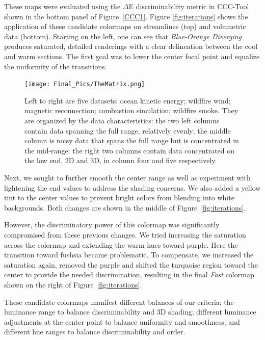 \documentclass{IEEEcsmag}
\newcommand*{\colormap}[1]{\textsl{#1}\xspace}
\newcommand*{\coolwarm}{\colormap{Cool to Warm}}
\newcommand*{\blueorange}{\colormap{Blue-Orange Diverging}}
\newcommand*{\fast}{\colormap{Fast}}
\begin{document}
These maps were evaluated using the $\Delta$E discriminability metric in CCC-Tool shown in the bottom panel of Figure~\ref{CCC1}. Figure \ref{fig:iterations} shows the application of these candidate colormaps on streamlines (top) and volumetric data (bottom).
Starting on the left, one can see that \blueorange produces saturated, detailed renderings with a clear delineation between the cool and warm sections.
The first goal was to lower the center focal point and equalize the uniformity of the transitions.

\begin{figure}[t]
\centering
\texttt{[image: Final\_Pics/TheMatrix.png]}
\caption{Left to right are five datasets: ocean kinetic energy; wildfire wind; magnetic reconnection; combustion simulation; wildfire smoke. They are organized by the data characteristics: the two left columns contain data spanning the full range, relatively evenly; the middle column is noisy data that spans the full range but is concentrated in the mid-range; the right two columns contain data concentrated on the low end, 2D and 3D, in column four and five respectively. }
\label{fig:Matrix}
\end{figure}


Next, we sought to further smooth the center range as well as experiment with lightening the end values to address the shading concerns.
We also added a yellow tint to the center values to prevent bright colors from blending into white backgrounds.
Both changes are shown in the middle of Figure~\ref{fig:iterations}.


However, the discriminatory power of this colormap was significantly compromised from these previous changes. We tried increasing the saturation across the colormap and extending the warm hues toward purple. Here the transition toward fushsia became problematic. To compensate, we increased the saturation again, removed the purple and shifted the turquoise region toward the center to provide the needed discrimination, resulting in the final \fast colormap shown on the right of Figure~\ref{fig:iterations}.

These candidate colormaps manifest different balances of our criteria: the luminance range to balance discriminability and 3D shading; different luminance adjustments at the center point to balance uniformity and smoothness; and different hue ranges to balance discriminability and order.


\end{document}
